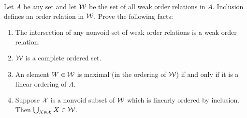 \begin{exercise}
Let $A$ be any set and let $\mathcal{W}$ be the set of all weak order relations in $A$. Inclusion
defines an order relation in $\mathcal{W}$. Prove the following facts:
\begin{enumerate}[label=(\alph*)]
    \item The intersection of any nonvoid set of weak order relations is a weak order relation.
    \item $\mathcal{W}$ is a complete ordered set.
    \item An element $W \in\mathcal{W}$ is maximal (in the ordering of $\mathcal{W}$) if and only if it is a linear ordering of $A$.
    \item Suppose $\mathcal{X}$ is a nonvoid subset of $\mathcal{W}$ which is linearly ordered by inclusion.
    Then $\bigcup_{X\in\mathcal{X}} X\in\mathcal{W}$.
\end{enumerate}
\end{exercise}

